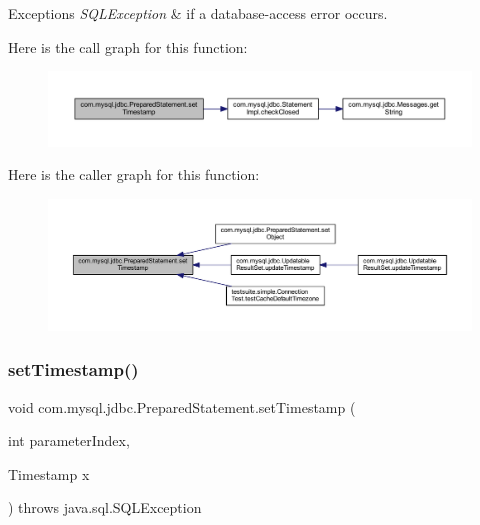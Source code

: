 \begin{DoxyExceptions}{Exceptions}
{\em S\+Q\+L\+Exception} & if a database-\/access error occurs. \\
\hline
\end{DoxyExceptions}
Here is the call graph for this function\+:
\nopagebreak
\begin{figure}[H]
\begin{center}
\leavevmode
\includegraphics[width=350pt]{classcom_1_1mysql_1_1jdbc_1_1_prepared_statement_a6ae79298e06ce58b5e8acb9d8fd66e65_cgraph}
\end{center}
\end{figure}
Here is the caller graph for this function\+:
\nopagebreak
\begin{figure}[H]
\begin{center}
\leavevmode
\includegraphics[width=350pt]{classcom_1_1mysql_1_1jdbc_1_1_prepared_statement_a6ae79298e06ce58b5e8acb9d8fd66e65_icgraph}
\end{center}
\end{figure}
\mbox{\label{classcom_1_1mysql_1_1jdbc_1_1_prepared_statement_acc2c80fd01dd1159ea8865da73016b8f}} 
\subsubsection{\texorpdfstring{set\+Timestamp()}{setTimestamp()}\hspace{0.1cm}{\footnotesize\ttfamily [2/2]}}
{\footnotesize\ttfamily void com.\+mysql.\+jdbc.\+Prepared\+Statement.\+set\+Timestamp (\begin{DoxyParamCaption}\item[{int}]{parameter\+Index,  }\item[{Timestamp}]{x }\end{DoxyParamCaption}) throws java.\+sql.\+S\+Q\+L\+Exception}

